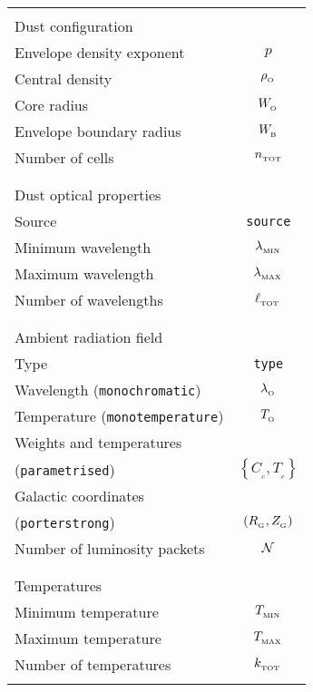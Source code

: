 \documentclass[usenatbib]{mn2e}
\newcommand{\subB}{_{_{\rm B}}}
\newcommand{\subO}{_{_{\rm O}}}
\numberwithin{equation}{section}
\begin{document}
\begin{tabular}{lc}\hline & \\
{\sc Dust configuration} & \\
Envelope density exponent $\;\;\;$ & $p$ \\
Central density & $\rho\subO$ \\
Core radius & $W\subO$ \\
Envelope boundary radius & $W\subB$ \\
Number of cells & $n_{_{\rm TOT}}$ \\ & \\\hline & \\
{\sc Dust optical properties} & \\
Source & \verb|source| \\
Minimum wavelength & $\lambda_{_{\rm MIN}}$ \\
Maximum wavelength & $\lambda_{_{\rm MAX}}$ \\
Number of wavelengths & $\ell_{_{\rm TOT}}$ \\ & \\\hline & \\
{\sc Ambient radiation field} & \\
Type & \verb|type| \\
Wavelength (\verb|monochromatic|) & $\lambda\subO$ \\
Temperature (\verb|monotemperature|) & $T\subO$ \\
Weights and temperatures & \\
\hspace*{2.4cm}(\verb|parametrised|) & $\left\{C_{_c},T_{_c}\right\}$ \\
Galactic coordinates & \\
\hspace*{2.4cm}(\verb|porterstrong|) & $\left(R_{_{\rm G}},Z_{_{\rm G}}\right)$ \\
Number of luminosity packets & ${\cal N}$ \\ & \\\hline & \\
{\sc Temperatures} & \\
Minimum temperature & $T_{_{\rm MIN}}$ \\
Maximum temperature & $T_{_{\rm MAX}}$ \\
Number of temperatures & $k_{_{\rm TOT}}$ \\ & \\\hline
\end{tabular}
\end{document}
